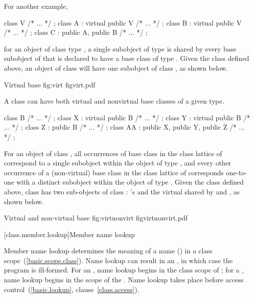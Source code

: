 \pnum
For another example,
\begin{codeblock}
class V { /* ... */ };
class A : virtual public V { /* ... */ };
class B : virtual public V { /* ... */ };
class C : public A, public B { /* ... */ };
\end{codeblock}
for an object  of class type , a single subobject of
type  is shared by every base subobject of  that is
declared to have a  base class of type .
Given the class  defined above, an object of class 
will have one subobject of class , as shown below.

%
%
\begin{importgraphic}
{Virtual base}
{fig:virt}
{figvirt.pdf}
\end{importgraphic}


\pnum
A class can have both virtual and nonvirtual base classes of a given
type.
\begin{codeblock}
class B { /* ... */ };
class X : virtual public B { /* ... */ };
class Y : virtual public B { /* ... */ };
class Z : public B { /* ... */ };
class AA : public X, public Y, public Z { /* ... */ };
\end{codeblock}
For an object of class , all  occurrences of
base class  in the class lattice of  correspond to a
single  subobject within the object of type , and
every other occurrence of a (non-virtual) base class  in the
class lattice of  corresponds one-to-one with a distinct
 subobject within the object of type . Given the
class  defined above, class  has two sub-objects of
class : 's  and the virtual  shared
by  and , as shown below.

%
%
%
\begin{importgraphic}
{Virtual and non-virtual base}
{fig:virtnonvirt}
{figvirtnonvirt.pdf}
\end{importgraphic}

\exitexampleb

[class.member.lookup]{Member name lookup}%
%
%

\pnum
Member name lookup determines the meaning of a name
() in a class scope~(\ref{basic.scope.class}).
Name lookup can result in an , in which case the
program is ill-formed. For an , name lookup
begins in the class scope of ; for a
, name lookup begins in the scope of the
. Name lookup takes place before access
control~(\ref{basic.lookup}, clause~\ref{class.access}).

